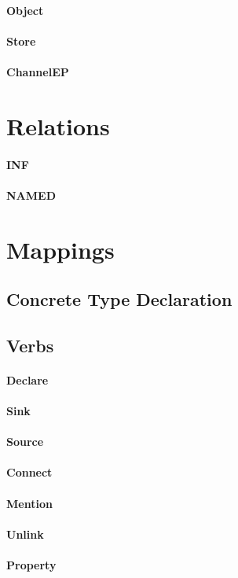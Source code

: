 \documentclass[12pt,twoside,openright,a4paper]{article}
\begin{document}
\paragraph{Object}

\paragraph{Store}

\paragraph{ChannelEP}

\section{Relations}

\paragraph{INF}

\paragraph{NAMED}

\section{Mappings}

\subsection{Concrete Type Declaration}

\subsection{Verbs}

\paragraph{Declare}

\paragraph{Sink}

\paragraph{Source}

\paragraph{Connect}

\paragraph{Mention}

\paragraph{Unlink}

\paragraph{Property}
\end{document}
